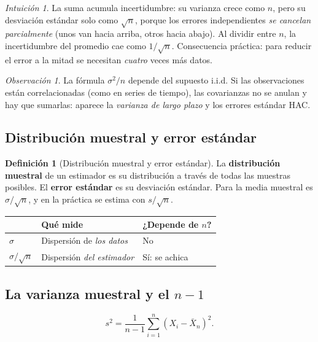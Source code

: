 \documentclass[11pt,a4paper]{article}
\theoremstyle{plain}
\theoremstyle{definition}
\newtheorem{definicion}[teorema]{Definición}
\theoremstyle{remark}
\newtheorem*{intuicion}{Intuición}
\newtheorem*{observacion}{Observación}
\begin{document}
\begin{intuicion}
La suma acumula incertidumbre: su varianza crece como $n$, pero su desviación estándar solo
como $\sqrt n$, porque los errores independientes \emph{se cancelan parcialmente} (unos van
hacia arriba, otros hacia abajo). Al dividir entre $n$, la incertidumbre del promedio cae como
$1/\sqrt n$. Consecuencia práctica: para reducir el error a la mitad se necesitan
\emph{cuatro} veces más datos.
\end{intuicion}

\begin{observacion}
La fórmula $\sigma^2/n$ depende del supuesto i.i.d. Si las observaciones están correlacionadas
(como en series de tiempo), las covarianzas no se anulan y hay que sumarlas: aparece la
\emph{varianza de largo plazo} y los errores estándar HAC.
\end{observacion}

\subsection{Distribución muestral y error estándar}

\begin{definicion}[Distribución muestral y error estándar]\label{def:se}
La \textbf{distribución muestral} de un estimador es su distribución a través de todas las
muestras posibles. El \textbf{error estándar} es su desviación estándar. Para la media
muestral es $\sigma/\sqrt n$, y en la práctica se estima con $s/\sqrt n$.
\end{definicion}

\begin{center}
\begin{tabular}{@{}lll@{}}
\toprule
 & Qué mide & ¿Depende de $n$? \\
\midrule
$\sigma$ & Dispersión de \emph{los datos} & No \\
$\sigma/\sqrt n$ & Dispersión \emph{del estimador} & Sí: se achica \\
\bottomrule
\end{tabular}
\end{center}

\subsection{La varianza muestral y el \texorpdfstring{$n-1$}{n-1}}

\[
s^2=\frac{1}{n-1}\sum_{i=1}^n(X_i-\bar X_n)^2 .
\]
\end{document}
